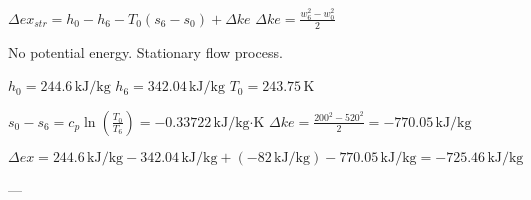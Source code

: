 \( \Delta ex_{str} = h_0 - h_6 - T_0 (s_6 - s_0) + \Delta ke \)  
\( \Delta ke = \frac{w_6^2 - w_0^2}{2} \)  

No potential energy.  
Stationary flow process.  

\( h_0 = 244.6 \, \text{kJ/kg} \)  
\( h_6 = 342.04 \, \text{kJ/kg} \)  
\( T_0 = 243.75 \, \text{K} \)  

\( s_0 - s_6 = c_p \ln \left( \frac{T_0}{T_6} \right) = -0.33722 \, \text{kJ/kg·K} \)  
\( \Delta ke = \frac{200^2 - 520^2}{2} = -770.05 \, \text{kJ/kg} \)  

\( \Delta ex = 244.6 \, \text{kJ/kg} - 342.04 \, \text{kJ/kg} + (-82 \, \text{kJ/kg}) - 770.05 \, \text{kJ/kg} = -725.46 \, \text{kJ/kg} \)  

---